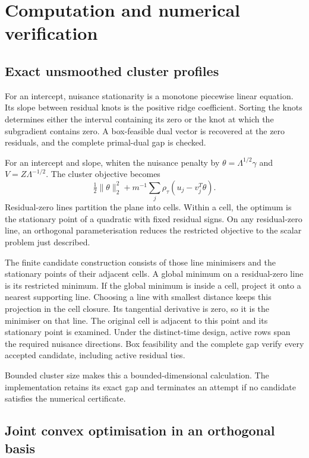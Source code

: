 \section{Computation and numerical verification}\label{supp:computation}

\subsection{Exact unsmoothed cluster profiles}

For an intercept, nuisance stationarity is a monotone piecewise
linear equation. Its slope between residual knots is the positive
ridge coefficient. Sorting the knots determines either the interval
containing its zero or the knot at which the subgradient contains
zero. A box-feasible dual vector is recovered at the zero residuals,
and the complete primal-dual gap is checked.

For an intercept and slope, whiten the nuisance penalty by
$\theta=\Lambda^{1/2}\gamma$ and $V=Z\Lambda^{-1/2}$. The cluster
objective becomes
\begin{equation}\label{eq:supp-finite-profile}
 \tfrac12\|\theta\|_2^2+
            m^{-1}\sum_j\rho_\tau(u_j-v_j^T\theta).
\end{equation}
Residual-zero lines partition the plane into cells. Within a cell,
the optimum is the stationary point of a quadratic with fixed
residual signs. On any residual-zero line, an orthogonal
parameterisation reduces the restricted objective to the scalar
problem just described.

The finite candidate construction consists of those line minimisers
and the stationary points of their adjacent cells. A global minimum
on a residual-zero line is its restricted minimum. If the global
minimum is inside a cell, project it onto a nearest supporting line.
Choosing a line with smallest distance keeps this projection in the
cell closure. Its tangential derivative is zero, so it is the
minimiser on that line. The original cell is adjacent to this point
and its stationary point is examined. Under the distinct-time
design, active rows span the required nuisance directions. Box
feasibility and the complete gap verify every accepted candidate,
including active residual ties.

Bounded cluster size makes this a bounded-dimensional calculation.
The implementation retains its exact gap and terminates an attempt
if no candidate satisfies the numerical certificate.

\subsection{Joint convex optimisation in an orthogonal basis}

